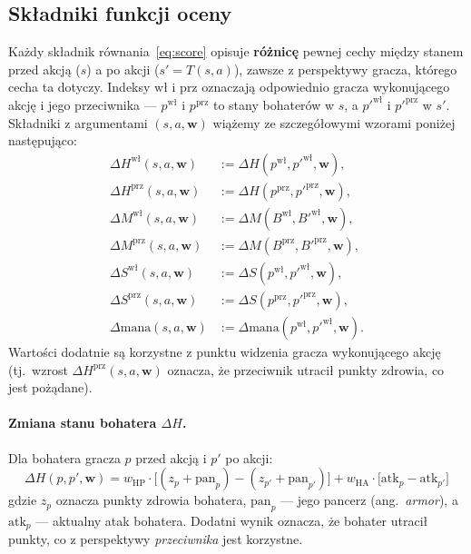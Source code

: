 \subsection{Składniki funkcji oceny}

Każdy składnik równania~\eqref{eq:score} opisuje \textbf{różnicę} pewnej cechy między stanem przed akcją ($s$) a po akcji ($s' = T(s,a)$), zawsze z perspektywy gracza, którego cecha ta dotyczy. Indeksy $\text{wł}$ i $\text{prz}$ oznaczają odpowiednio gracza wykonującego akcję i jego przeciwnika --- $p^{\text{wł}}$ i $p^{\text{prz}}$ to stany bohaterów w $s$, a $p'^{\text{wł}}$ i $p'^{\text{prz}}$ w $s'$. Składniki z argumentami $(s,a,\mathbf{w})$ wiążemy ze szczegółowymi wzorami poniżej następująco:
\begin{align}
    \Delta H^{\text{wł}}(s,a,\mathbf{w}) &:= \Delta H(p^{\text{wł}}, p'^{\text{wł}}, \mathbf{w}), \\
    \Delta H^{\text{prz}}(s,a,\mathbf{w}) &:= \Delta H(p^{\text{prz}}, p'^{\text{prz}}, \mathbf{w}), \\
    \Delta M^{\text{wł}}(s,a,\mathbf{w}) &:= \Delta M(B^{\text{wł}}, B'^{\text{wł}}, \mathbf{w}), \\
    \Delta M^{\text{prz}}(s,a,\mathbf{w}) &:= \Delta M(B^{\text{prz}}, B'^{\text{prz}}, \mathbf{w}), \\
    \Delta S^{\text{wł}}(s,a,\mathbf{w}) &:= \Delta S(p^{\text{wł}}, p'^{\text{wł}}, \mathbf{w}), \\
    \Delta S^{\text{prz}}(s,a,\mathbf{w}) &:= \Delta S(p^{\text{prz}}, p'^{\text{prz}}, \mathbf{w}), \\
    \Delta\text{mana}(s,a,\mathbf{w}) &:= \Delta\text{mana}(p^{\text{wł}}, p'^{\text{wł}}, \mathbf{w}).
\end{align}
Wartości dodatnie są korzystne z punktu widzenia gracza wykonującego akcję (tj.\ wzrost $\Delta H^{\text{prz}}(s,a,\mathbf{w})$ oznacza, że przeciwnik utracił punkty zdrowia, co jest pożądane).

\paragraph{Zmiana stanu bohatera $\Delta H$.}

Dla bohatera gracza $p$ przed akcją i $p'$ po akcji:
\begin{equation}
    \Delta H(p, p', \mathbf{w}) =
        w_{\text{HP}} \cdot
        \bigl[(z_p + \text{pan}_p) - (z_{p'} + \text{pan}_{p'})\bigr]
        + w_{\text{HA}} \cdot
        \bigl[\text{atk}_p - \text{atk}_{p'}\bigr]
    \label{eq:delta_h}
\end{equation}
gdzie $z_p$ oznacza punkty zdrowia bohatera, $\text{pan}_p$ --- jego pancerz (ang.~\textit{armor}), a $\text{atk}_p$ --- aktualny atak bohatera. Dodatni wynik oznacza, że bohater utracił punkty, co z perspektywy \emph{przeciwnika} jest korzystne.

